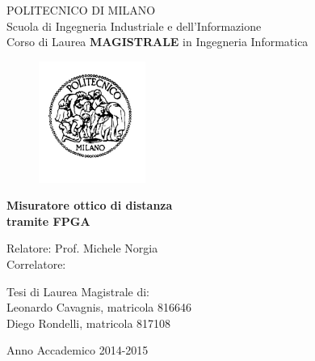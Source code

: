 \thispagestyle{empty}
\vspace*{-1.5cm} \bfseries{
\begin{center}
  \large
  POLITECNICO DI MILANO\\
  \normalsize
  Scuola di Ingegneria Industriale e dell'Informazione\\
  Corso di Laurea \textbf{MAGISTRALE} in Ingegneria Informatica\\
  \begin{figure}[htbp]
    \begin{center}
      \includegraphics[width=3.5cm]{./pictures/logopm}
    \end{center}
  \end{figure}
  \vspace*{0.3cm} \LARGE



  \textbf{Misuratore ottico di distanza 	\\tramite FPGA}\\



  \vspace*{.75truecm} \large
\end{center}
\vspace*{3.0cm} \large
\begin{flushleft}


  Relatore: Prof. Michele Norgia \\
  Correlatore: 

\end{flushleft}
\vspace*{1.0cm}
\begin{flushright}


  Tesi di Laurea Magistrale di:\\ Leonardo Cavagnis, matricola 816646 \\ 
		       Diego Rondelli, matricola 817108 \\


\end{flushright}
\vspace*{0.5cm}
\begin{center}



  Anno Accademico 2014-2015
\end{center} \clearpage
}

